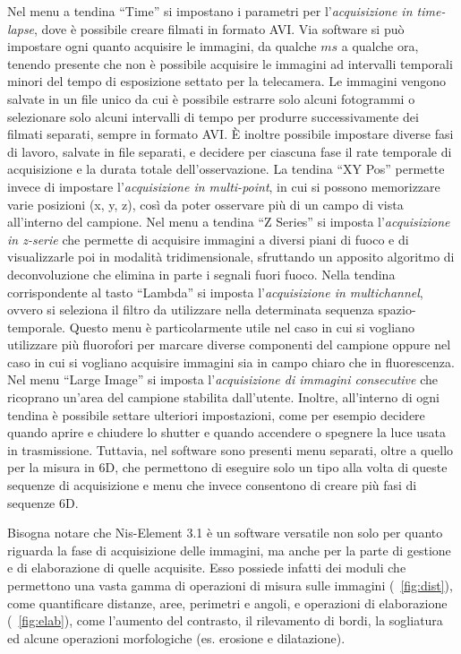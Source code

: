 Nel menu a tendina ``Time'' si impostano i parametri per l'\textit{acquisizione in time-lapse}, dove è possibile creare filmati in formato AVI. 
Via software si può impostare ogni quanto acquisire le immagini, da qualche $ms$ a qualche ora, tenendo presente che non è possibile acquisire le immagini ad intervalli temporali minori del tempo di esposizione settato per la telecamera. 
Le immagini vengono salvate in un file unico da cui è possibile estrarre solo alcuni fotogrammi o selezionare solo alcuni intervalli di tempo per produrre successivamente dei filmati separati, sempre in formato AVI. 
È inoltre possibile impostare diverse fasi di lavoro, salvate in file separati, e decidere per ciascuna fase il rate temporale di acquisizione e la durata totale dell'osservazione. 
La tendina ``XY Pos'' permette invece di impostare l'\textit{acquisizione in multi-point}, in cui si possono memorizzare varie posizioni (x, y, z), così da poter osservare più di un campo di vista all'interno del campione. 
Nel menu a tendina ``Z Series'' si imposta l'\textit{acquisizione in z-serie} che permette di acquisire immagini a diversi piani di fuoco e di visualizzarle poi in modalità tridimensionale, sfruttando un apposito algoritmo di deconvoluzione che elimina in parte i segnali fuori fuoco.
Nella tendina corrispondente al tasto ``Lambda'' si imposta l'\textit{acquisizione in multichannel}, ovvero si seleziona il filtro da utilizzare nella determinata sequenza spazio-temporale. 
Questo menu è particolarmente utile nel caso in cui si vogliano utilizzare più fluorofori per marcare diverse componenti del campione oppure nel caso in cui si vogliano acquisire immagini sia in campo chiaro che in fluorescenza. 
Nel menu ``Large Image'' si imposta l'\textit{acquisizione di immagini consecutive} che ricoprano un'area del campione stabilita dall'utente.
Inoltre, all'interno di ogni tendina è possibile settare ulteriori impostazioni, come per esempio decidere quando aprire e chiudere lo shutter e quando accendere o spegnere la luce usata in trasmissione.
Tuttavia, nel software sono presenti menu separati, oltre a quello per la misura in 6D, che permettono di eseguire solo un tipo alla volta di queste sequenze di acquisizione e menu che invece consentono di creare più fasi di sequenze 6D.

Bisogna notare che Nis-Element 3.1 è un software versatile non solo per quanto riguarda la fase di acquisizione delle immagini, ma anche per la parte di gestione e di elaborazione di quelle acquisite. 
Esso possiede infatti dei moduli che permettono una vasta gamma di operazioni di misura sulle immagini (\figurename~\ref{fig:dist}), come quantificare distanze, aree, perimetri e angoli, e operazioni di elaborazione (\figurename~\ref{fig:elab}), come l'aumento del contrasto, il rilevamento di bordi, la sogliatura ed alcune operazioni morfologiche (es. erosione e dilatazione).

